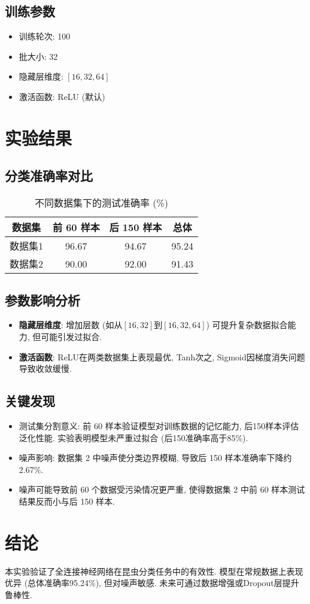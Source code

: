 \documentclass{article}
\begin{document}
\subsection{训练参数}
\begin{itemize}
    \item 训练轮次: 100
    \item 批大小: 32
    \item 隐藏层维度: $[16, 32, 64]$
    \item 激活函数: ReLU (默认) 
\end{itemize}

\section{实验结果}
\subsection{分类准确率对比}
\begin{table}[ht]
    \centering
    \caption{不同数据集下的测试准确率 (\%)}
    \label{tab:acc}
    \begin{tabular}{cccc}
        \toprule
        数据集 & 前 60 样本 & 后 150 样本 & 总体 \\
        \midrule
        数据集1 & 96.67 & 94.67 & 95.24 \\
        数据集2 & 90.00 & 92.00 & 91.43 \\
        \bottomrule
    \end{tabular}
\end{table}

\subsection{参数影响分析}
\begin{itemize}
    \item \textbf{隐藏层维度}: 增加层数 (如从$[16,32]$到$[16,32,64]$) 可提升复杂数据拟合能力, 但可能引发过拟合.
    \item \textbf{激活函数}: ReLU在两类数据集上表现最优, Tanh次之, Sigmoid因梯度消失问题导致收敛缓慢.
\end{itemize}

\subsection{关键发现}
\begin{itemize}
    \item 测试集分割意义: 前 60 样本验证模型对训练数据的记忆能力, 后150样本评估泛化性能. 实验表明模型未严重过拟合 (后150准确率高于85\%).
    \item 噪声影响: 数据集 2 中噪声使分类边界模糊, 导致后 150 样本准确率下降约 2.67\%.
    \item 噪声可能导致前 60 个数据受污染情况更严重, 使得数据集 2 中前 60 样本测试结果反而小与后 150 样本.
\end{itemize}

\section{结论}
本实验验证了全连接神经网络在昆虫分类任务中的有效性. 模型在常规数据上表现优异 (总体准确率95.24\%), 但对噪声敏感. 未来可通过数据增强或Dropout层提升鲁棒性.
\end{document}
